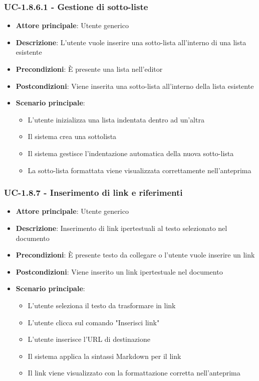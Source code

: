 \documentclass[11pt,a4paper]{article}
\begin{document}
\subsubsection{UC-1.8.6.1 - Gestione di sotto-liste}
\begin{itemize}
    \item \textbf{Attore principale}: Utente generico
    \item \textbf{Descrizione}: L'utente vuole inserire una sotto-lista all'interno di una lista esistente
    \item \textbf{Precondizioni}: È presente una lista nell'editor
    \item \textbf{Postcondizioni}: Viene inserita una sotto-lista all'interno della lista esistente
    \item \textbf{Scenario principale}:
        \begin{itemize}
            \item L'utente inizializza una lista indentata dentro ad un'altra
            \item Il sistema crea una sottolista
            \item Il sistema gestisce l'indentazione automatica della nuova sotto-lista
            \item La sotto-lista formattata viene visualizzata correttamente nell'anteprima
        \end{itemize}
\end{itemize}

\subsubsection{UC-1.8.7 - Inserimento di link e riferimenti}
\begin{itemize}
    \item \textbf{Attore principale}: Utente generico
    \item \textbf{Descrizione}: Inserimento di link ipertestuali al testo selezionato nel documento
    \item \textbf{Precondizioni}: È presente testo da collegare o l'utente vuole inserire un link
    \item \textbf{Postcondizioni}: Viene inserito un link ipertestuale nel documento
    \item \textbf{Scenario principale}:
        \begin{itemize}
            \item L'utente seleziona il testo da trasformare in link
            \item L'utente clicca sul comando "Inserisci link"
            \item L'utente inserisce l'URL di destinazione
            \item Il sistema applica la sintassi Markdown per il link
            \item Il link viene visualizzato con la formattazione corretta nell'anteprima
        \end{itemize}
\end{itemize}
\end{document}
